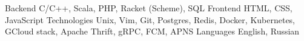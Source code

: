 

\begin{cvskills}

  \cvskill
    {Backend} %
    {C/C++, Scala, PHP, Racket (Scheme), SQL} %
  \cvskill
    {Frontend} %
    {HTML, CSS, JavaScript} %
\cvskill
  {Technologies} %
  {Unix, Vim, Git, Postgres, Redis, Docker, Kubernetes, GCloud stack, Apache Thrift, gRPC, FCM, APNS} %
  \cvskill
    {Languages} %
    {English, Russian} %

\end{cvskills}
